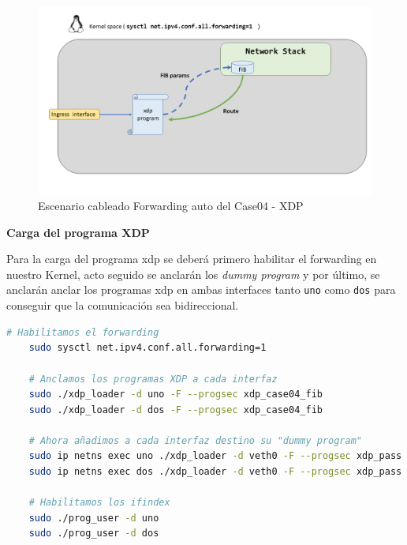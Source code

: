 \begin{figure}[ht]
    \centering
    \includegraphics[width=16cm]{archivos/img/dev/xdp/case04/scenario_03.png}
    \caption{Escenario cableado Forwarding auto del Case04 - XDP}
    \label{fig:case04_xdp_ether_scenario3}
\end{figure}
\newpage
\vspace{1cm}
\textbf{Carga del programa XDP}\\
\par
Para la carga del programa \gls{xdp} se deberá primero habilitar el forwarding en nuestro Kernel, acto seguido se anclarán los \textit{dummy program} y por último, se anclarán anclar los programas \gls{xdp} en ambas interfaces tanto \texttt{uno} como \texttt{dos} para conseguir que la comunicación sea bidireccional.
\vspace{0.5cm}

\begin{lstlisting}[language= bash, style=Consola, caption={Carga del programa XDP Forwarding auto - Case04},label=code:case04_xdp_ether_load3]
    # Habilitamos el forwarding 
    sudo sysctl net.ipv4.conf.all.forwarding=1
    
    # Anclamos los programas XDP a cada interfaz 
    sudo ./xdp_loader -d uno -F --progsec xdp_case04_fib
    sudo ./xdp_loader -d dos -F --progsec xdp_case04_fib
    
    # Ahora añadimos a cada interfaz destino su "dummy program"
    sudo ip netns exec uno ./xdp_loader -d veth0 -F --progsec xdp_pass
    sudo ip netns exec dos ./xdp_loader -d veth0 -F --progsec xdp_pass
    
    # Habilitamos los ifindex 
    sudo ./prog_user -d uno
    sudo ./prog_user -d dos
\end{lstlisting}

